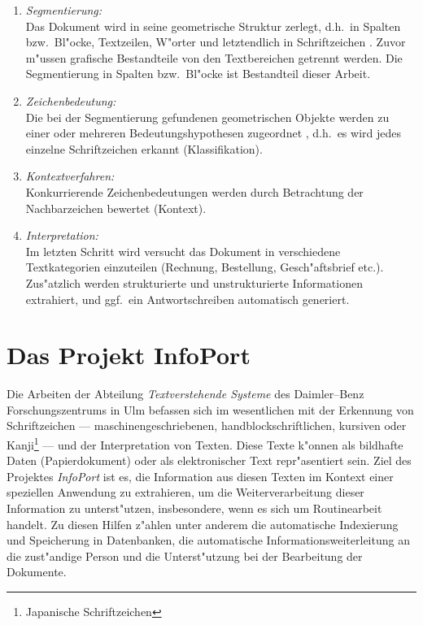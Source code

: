 \begin{enumerate}
\item {\em Segmentierung:}\\
Das Dokument wird in seine geometrische Struktur zerlegt, d.h.\
in Spalten bzw.\ Bl"ocke, Textzeilen, W"orter und letztendlich in
Schriftzeichen \cite{Bohnacker93}. Zuvor m"ussen grafische Bestandteile von
den Textbereichen getrennt werden. Die Segmentierung in Spalten
bzw.\ Bl"ocke ist Bestandteil dieser Arbeit.

\item {\em Zeichenbedeutung:}\\
Die bei der Segmentierung gefundenen geometrischen Objekte werden zu
einer oder mehreren Bedeutungshypothesen zugeordnet \cite{Schuermann77}, d.h.\ es wird jedes
einzelne Schriftzeichen erkannt (Klassifikation).

\item {\em Kontextverfahren:}\\
Konkurrierende Zeichenbedeutungen werden durch Betrachtung der Nachbarzeichen bewertet (Kontext).

\item {\em Interpretation:}\\
Im letzten Schritt wird versucht das Dokument in verschiedene
Textkategorien einzuteilen (Rechnung, Bestellung, Gesch"aftsbrief
etc.). Zus"atzlich werden strukturierte und unstrukturierte
Informationen extrahiert, und ggf.\ ein Antwortschreiben automatisch
generiert.
\end{enumerate}

\section{Das Projekt InfoPort}
\label{InfoPort}

Die Arbeiten der Abteilung {\sl Textverstehende Systeme\/} des
Daimler--Benz Forschungszentrums in Ulm befassen sich im wesentlichen mit 
der Erkennung von Schriftzeichen --- maschinengeschriebenen, handblockschriftlichen, kursiven oder 
Kanji\footnote{Japanische Schriftzeichen} ---  und
der Interpretation von Texten. Diese Texte k"onnen als bildhafte Daten
(Papierdokument) oder als elektronischer Text repr"asentiert
sein. Ziel des Projektes {\sl InfoPort\/} \cite{InfoPortLab} ist es,
die Information aus diesen Texten im Kontext einer speziellen Anwendung
zu extrahieren, um die Weiterverarbeitung dieser Information zu unterst"utzen,
insbesondere, wenn es sich um Routinearbeit handelt. 
Zu diesen Hilfen z"ahlen unter anderem die automatische
Indexierung und Speicherung in Datenbanken, die automatische
Informationsweiterleitung an die zust"andige Person und die
Unterst"utzung bei der Bearbeitung der Dokumente.

